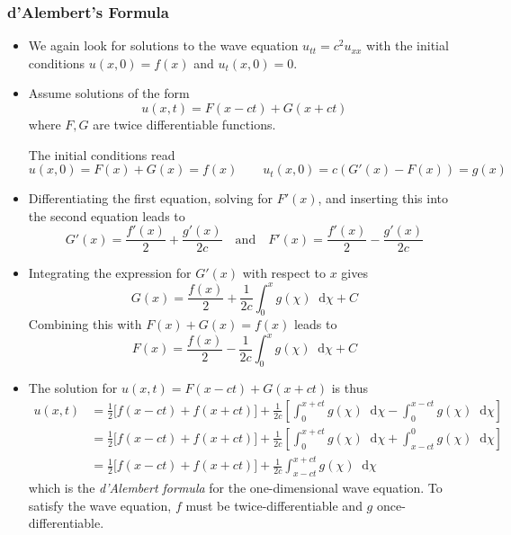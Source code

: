 \documentclass[11pt, a4paper]{article}
\newcommand{\diff}{\mathop{}\!\mathrm{d}} %
\begin{document}
\subsubsection{d'Alembert's Formula}
\begin{itemize}
	\item We again look for solutions to the wave equation $ u_{tt} = c^{2}u_{xx} $ with the initial conditions $ u(x, 0) = f(x) $ and $ u_{t}(x, 0) = 0$. 
	
	\item Assume solutions of the form
	\begin{equation*}
		u(x, t) = F(x - ct) + G(x + ct)
	\end{equation*}	
	where $ F, G $ are twice differentiable functions.
	
	The initial conditions read
	\begin{equation*}
		u(x, 0) = F(x) + G(x) = f(x) \qquad u_{t}(x, 0) = c(G'(x) - F(x)) = g(x)
	\end{equation*}
	
	\item Differentiating the first equation, solving for $ F'(x) $, and inserting this into the second equation leads to
	\begin{equation*}
		G'(x) = \frac{f'(x)}{2} + \frac{g'(x)}{2c} \quad \text{and} \quad F'(x) = \frac{f'(x)}{2} - \frac{g'(x)}{2c}
	\end{equation*}
	
	\item Integrating the expression for $ G'(x) $ with respect to $ x $ gives
	\begin{equation*}
		G(x) = \frac{f(x)}{2} + \frac{1}{2c} \int_{0}^{x} g(\chi)\diff \chi + C
	\end{equation*}
	Combining this with $ F(x) + G(x) = f(x) $ leads to
	\begin{equation*}
		F(x) = \frac{f(x)}{2} - \frac{1}{2c} \int_{0}^{x} g(\chi)\diff \chi + C
	\end{equation*}
	
	\item The solution for $ u(x, t) = F(x - ct) + G(x + ct) $ is thus
	\begin{align*}
		u(x, t) &= \frac{1}{2}\big[ f(x-ct) + f(x + ct)\big] + \frac{1}{2c}\left[\int_{0}^{x+ct}g(\chi)\diff \chi - \int_{0}^{x-ct}g(\chi)\diff \chi \right]\\
		&= \frac{1}{2}\big[ f(x-ct) + f(x + ct)\big] + \frac{1}{2c}\left[\int_{0}^{x+ct}g(\chi)\diff \chi + \int_{x-ct}^{0}g(\chi)\diff \chi \right]\\
		&= \frac{1}{2}\big[ f(x-ct) + f(x + ct)\big] + \frac{1}{2c} \int_{x-ct}^{x+ct}g(\chi)\diff \chi
	\end{align*}
	which is the \textit{d'Alembert formula} for the one-dimensional wave equation. To satisfy the wave equation, $ f $ must be twice-differentiable and $ g $ once-differentiable.
	

\end{itemize}
\end{document}

